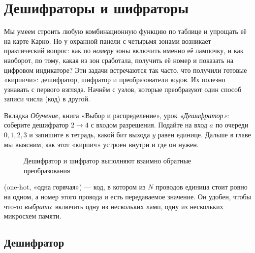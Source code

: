 \chapter{Дешифраторы и шифраторы}
\label{ch:coders}

Мы умеем строить любую комбинационную функцию по таблице и упрощать её на
карте Карно. Но у охранной панели с четырьмя зонами возникает практический
вопрос: как по \emph{номеру} зоны включить именно её лампочку, и как
наоборот, по тому, какая из зон сработала, получить её номер и показать
на цифровом индикаторе? Эти задачи встречаются так часто, что получили
готовые «кирпичи»: дешифратор, шифратор и преобразователи кодов. Их
полезно узнавать с первого взгляда. Начнём с узлов, которые преобразуют один
способ записи числа (код) в другой.

\begin{buildbox}
Вкладка \emph{Обучение}, книга «Выбор и распределение», урок
\emph{«Дешифратор»}: соберите дешифратор $2\to4$ с входом разрешения.
Подайте на вход $a$ по очереди $0,1,2,3$ и запишите в тетрадь, какой бит
выхода $y$ равен единице. Дальше в главе мы выясним, как этот
«кирпич» устроен внутри и где он нужен.
\end{buildbox}

\begin{figure}[H]
\centering
{}
\caption{Дешифратор и шифратор выполняют взаимно обратные преобразования}
\end{figure}

 (one-hot, «одна горячая») --- код, в котором из $N$
проводов единица стоит ровно на одном, а номер этого провода и есть
передаваемое значение. Он удобен, чтобы что-то \emph{выбрать}: включить одну из
нескольких ламп, одну из нескольких микросхем памяти.

\section{Дешифратор}

